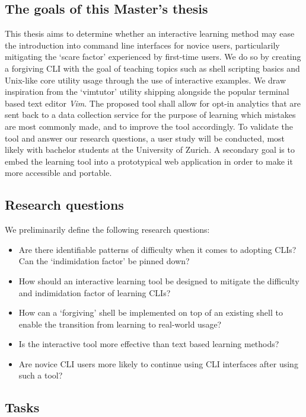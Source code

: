 \documentclass{task_description}
\begin{document}
\subsection*{The goals of this Master's thesis}
This thesis aims to determine whether an interactive learning method may ease
the introduction into command line interfaces for novice users, particularily
mitigating the `scare factor' experienced by first-time users. We do so by
creating a forgiving CLI with the goal of teaching topics such as shell
scripting basics and Unix-like core utility usage through the use of
interactive examples. We draw inspiration from the `vimtutor'
\cite{pierce_ware_smith_moolenaar_2019} utility shipping alongside the popular
terminal based text editor \emph{Vim}. The proposed tool shall allow for opt-in
analytics that are sent back to a data collection service for the purpose of
learning which mistakes are most commonly made, and to improve the tool
accordingly. To validate the tool and answer our research questions,
a user study will be conducted, most likely
with bachelor students at the University of Zurich. A secondary goal is to
embed the learning tool into a prototypical web application in order
to make it more accessible and portable.

\subsection*{Research questions}
We preliminarily define the following research questions:

\begin{itemize}
    \item Are there identifiable patterns of difficulty when it
          comes to adopting CLIs? Can the `indimidation factor' be pinned down?
    \item How should an interactive learning tool be designed to mitigate
          the difficulty and indimidation factor of learning CLIs?
    \item How can a `forgiving' shell be implemented on top of an existing
          shell to enable the transition from learning to real-world usage?
    \item Is the interactive tool more effective than text based learning methods?
    \item Are novice CLI users more likely to continue
          using CLI interfaces after using such a tool?
\end{itemize}

\subsection*{Tasks}
\end{document}
